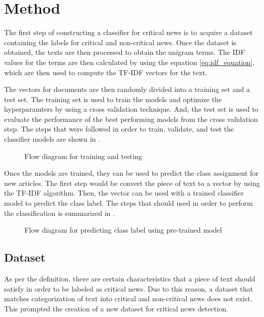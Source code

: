 \chapter{Method} \label{method}
The first step of constructing a classifier for critical news is to acquire a dataset containing the labels for critical and non-critical news. Once the dataset is obtained, the texts are then processed to obtain the unigram terms. The IDF values for the terms are then calculated by using the equation \eqref{eq:idf_equation}, which are then used to compute the TF-IDF vectors for the text.

The vectors for documents are then randomly divided into a training set and a test set. The training set is used to train the models and optimize the hyperparamters by using a cross validation technique. And, the test set is used to evaluate the performance of the best performing models from the cross validation step. The steps that were followed in order to train, validate, and test the classifier models are shown in .

\begin{figure}[h]
    \caption{Flow diagram for training and testing}
    \label{fig:training}
\end{figure}

Once the models are trained, they can be used to predict the class assignment for new articles. The first step would be convert the piece of text to a vector by using the TF-IDF algorithm. Then, the vector can be used with a trained classifier model to predict the class label. The steps that should used in order to perform the classification is summarized in .

\begin{figure}[h]
    \caption{Flow diagram for predicting class label using pre-trained model}
    \label{fig:prediction}
\end{figure}

\section{Dataset}
As per the definition, there are certain characteristics that a piece of text should satisfy in order to be labeled as critical news. Due to this reason, a dataset that matches categorization of text into critical and non-critical news does not exist. This prompted the creation of a new dataset for critical news detection.

